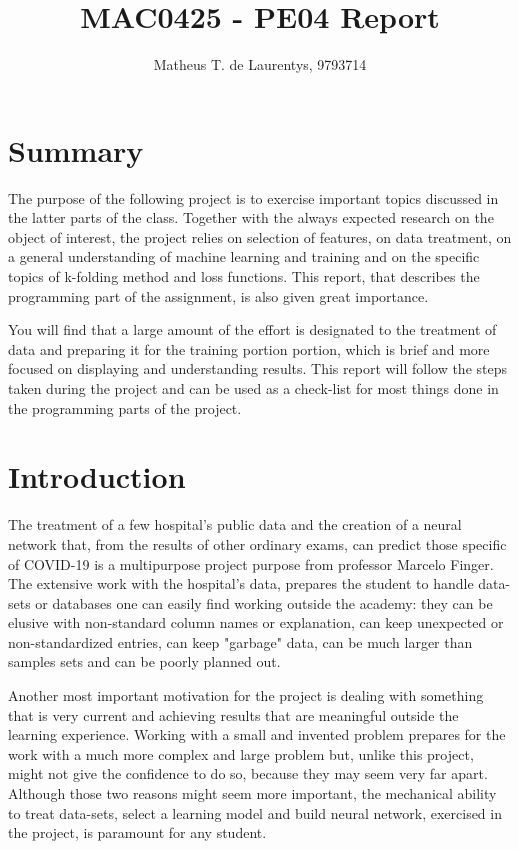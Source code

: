 \documentclass[]{article}
\title{\vspace{-4.0cm}MAC0425 - PE04 Report}
\author{Matheus T. de Laurentys, 9793714}
\begin{document}
\maketitle
\section{Summary}

The purpose of the following project is to exercise important topics discussed in the latter parts of the class. Together with the always expected research on the object of interest, the project relies on selection of features, on data treatment, on a general understanding of machine learning and training and on the specific topics of k-folding method and loss functions. This report, that describes the programming part of the assignment, is also given great importance.

You will find that a large amount of the effort is designated to the treatment of data and preparing it for the training portion portion, which is brief and more focused on displaying and understanding results. This report will follow the steps taken during the project and can be used as a check-list for most things done in the programming parts of the project.

\section{Introduction}

The treatment of a few hospital's public data and the creation of a neural network that, from the results of other ordinary exams, can predict those specific of COVID-19 is a multipurpose project purpose from professor Marcelo Finger. The extensive work with the hospital's data, prepares the student to handle data-sets or databases one can easily find working outside the academy: they can be elusive with non-standard column names or explanation, can keep unexpected or non-standardized entries, can keep "garbage" data, can be much larger than samples sets and can be poorly planned out.

Another most important motivation for the project is dealing with something that is very current and achieving results that are meaningful outside the learning experience. Working with a small and invented problem prepares for the work with a much more complex and large problem but, unlike this project, might not give the confidence to do so, because they may seem very far apart. Although those two reasons might seem more important, the mechanical ability to treat data-sets, select a learning model and build neural network, exercised in the project, is paramount for any student.
\end{document}
